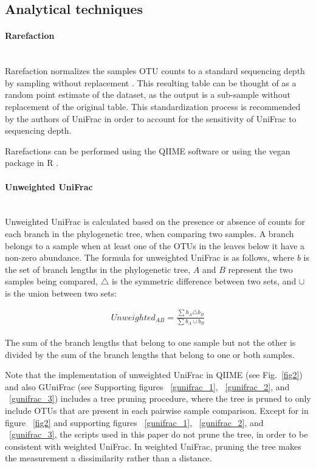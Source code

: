 \documentclass[10pt,letterpaper]{article}
\begin{document}
\subsection{Analytical techniques}

\paragraph{Rarefaction}\mbox{}\\
Rarefaction normalizes the samples OTU counts to a standard sequencing depth by sampling without replacement \cite{simberloff1978use}. This resulting table can be thought of as a random point estimate of the dataset, as the output is a sub-sample without replacement of the original table. This standardization process is recommended by the authors of UniFrac \cite{de2011evaluation} in order to account for the sensitivity of UniFrac to sequencing depth.

Rarefactions can be performed using the QIIME software \cite{caporaso2010qiime} or using the vegan package in R \cite{oksanen2007vegan}.

\paragraph{Unweighted UniFrac}\mbox{}\\
Unweighted UniFrac is calculated based on the presence or absence of counts for each branch in the phylogenetic tree, when comparing two samples. A branch belongs to a sample when at least one of the OTUs in the leaves below it have a non-zero abundance. The formula for unweighted UniFrac is as follows, where $b$ is the set of branch lengths in the phylogenetic tree, $A$ and $B$ represent the two samples being compared, $\triangle$ is the symmetric difference between two sets, and $\cup$ is the union between two sets:

\begin{align*}
Unweighted_{AB} = \frac{\sum_{}{} b_{A} \triangle b_{B}}{\sum_{}{} b_{A} \cup b_{B}}
\end{align*}

The sum of the branch lengths that belong to one sample but not the other is divided by the sum of the branch lengths that belong to one or both samples.

Note that the implementation of unweighted UniFrac in QIIME (see Fig.~\ref{fig2}) and also GUniFrac (see Supporting figures ~\ref{gunifrac_1}, ~\ref{gunifrac_2}, and ~\ref{gunifrac_3}) includes a tree pruning procedure, where the tree is pruned to only include OTUs that are present in each pairwise sample comparison. Except for in figure ~\ref{fig2} and supporting figures ~\ref{gunifrac_1}, ~\ref{gunifrac_2}, and ~\ref{gunifrac_3}, the scripts used in this paper do not prune the tree, in order to be consistent with weighted UniFrac. In weighted UniFrac, pruning the tree makes the measurement a dissimilarity rather than a distance.
\end{document}
